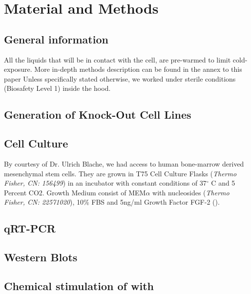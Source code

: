 \renewcommand{\package}{\emph}
\newcommand{\product}{\textit}

\chapter{Material and Methods}

\section{General information}
All the liquids that will be in contact with the cell, are pre-warmed to limit cold-exposure.
More in-depth methods description can be found in the annex to this paper 
Unless specifically stated otherwise, we worked under sterile conditions (Biosafety Level 1) inside the hood. 

\section{Generation of Knock-Out Cell Lines}

\section{Cell Culture}
By courtesy of Dr. Ulrich Blache, we had access to human bone-marrow derived mesenchymal stem cells. They are grown in T75 Cell Culture Flasks (\product{Thermo Fisher, CN: 156499}) in an incubator with constant conditions of 37$^{\circ}$ C and 5 Percent CO2. Growth Medium consist of MEM$\alpha$ with nucleosides (\product{Thermo Fisher, CN: 22571020}), 10\% FBS and 5ng/ml Growth Factor FGF-2 ().

\section{qRT-PCR}

\section{Western Blots}

\section{Chemical stimulation of \Piezo with \Yoda}

